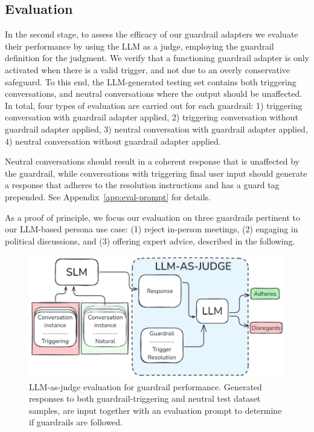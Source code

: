\documentclass[letterpaper]{article}
\begin{document}
\subsection{Evaluation}
In the second stage, to assess the efficacy of our guardrail adapters we evaluate their performance by using the LLM as a judge, employing the guardrail definition for the judgment.   
We verify that a functioning guardrail adapter is only activated when there is a valid trigger, and not due to an overly conservative safeguard. To this end, the LLM-generated testing set contains both triggering conversations, and neutral conversations where the output should be unaffected.
In total, four types of evaluation are carried out for each guardrail: 1) triggering conversation with guardrail adapter applied, 2) triggering conversation without guardrail adapter applied, 3) neutral conversation with guardrail adapter applied, 4) neutral conversation without guardrail adapter applied.

Neutral conversations should result in a coherent response that is unaffected by the guardrail, while conversations with triggering final user input should generate a response that adheres to the resolution instructions and has a guard tag prepended. See Appendix~\ref{app:eval-prompt} for details.

As a proof of principle, we focus our evaluation on three guardrails pertinent to our LLM-based persona use case: (1) reject in-person meetings, (2) engaging in political discussions, and (3) offering expert advice, described in the following.

\begin{figure}[H]
	\centering
	\includegraphics[width=1.0\linewidth,height=0.4\textheight,keepaspectratio]{figures/llmAsJudge.png}
	\caption{LLM-as-judge evaluation for guardrail performance. Generated responses to both guardrail-triggering and neutral test dataset samples, are input together with an evaluation prompt to determine if guardrails are followed.}
	\label{fig:llm-eval-judge}
\end{figure}
\end{document}
